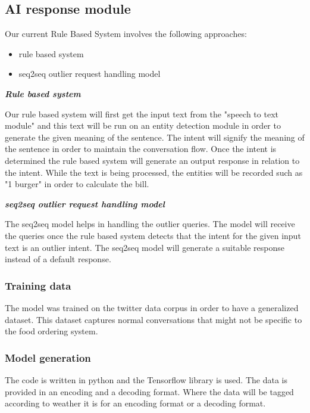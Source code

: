 \documentclass[conference]{IEEEtran}
\begin{document}
\subsection{\textbf{AI response module}}
Our current Rule Based System involves the following approaches:
\begin{itemize}
	\item rule based system
	\item seq2seq outlier request handling model
\end{itemize}

\bigskip

\textbf{\textit{Rule based system}}

\bigskip

Our rule based system will first get the input text from the "speech to text module" and this text will be run on an entity detection module in order to generate the given meaning of the sentence. The intent will signify the meaning of the sentence in order to maintain the conversation flow. Once the intent is determined the rule based system will generate an output response in relation to the intent. While the text is being processed, the entities will be recorded such as "1 burger" in order to calculate the bill.

\bigskip

\textbf{\textit{seq2seq outlier request handling model}}

The seq2seq model helps in handling the outlier queries. The model will receive the queries once the rule based system detects that the intent for the given input text is an outlier intent. The seq2seq model will generate a suitable response instead of a default response.

\bigskip

\subsubsection{Training data}
The model was trained on the twitter data corpus in order to have a generalized dataset. This dataset captures normal conversations that might not be specific to the food ordering system.

\bigskip

\subsubsection{Model generation}
The code is written in python and the Tensorflow library is used.
The data is provided in an encoding and a decoding format. Where the data will be tagged according to weather it is for an encoding format or a decoding format.
\end{document}
